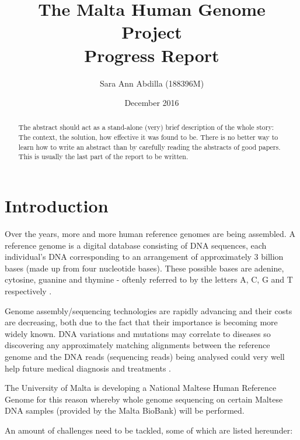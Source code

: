 \documentclass{csfyp}
\title{The Malta Human Genome Project \\
  \large Progress Report}
\author{Sara Ann Abdilla (188396M)}
\date{December 2016}
\begin{document}
\tableofcontents

\maketitle

\setcounter{page}{1}


\begin{abstract}
The abstract should act as a stand-alone (very) brief description of the whole story: The context, the solution, how effective it was found to be. There is no better way to learn how to write an abstract than by carefully reading the abstracts of good papers. This is usually the last part of the report to be written.
\end{abstract}


\section{Introduction}
\label{s:intro}

Over the years, more and more human reference genomes are being assembled.  A reference genome is a digital database consisting of DNA sequences, each individual's DNA corresponding to an arrangement of approximately 3 billion bases (made up from four nucleotide bases).  These possible bases are adenine, cytosine, guanine and thymine - oftenly referred to by the letters A, C, G and T respectively \cite{aiBk, introgenom}.  

Genome assembly/sequencing technologies are rapidly advancing and their costs are decreasing, both due to the fact that their importance is becoming more widely known.  DNA variations and mutations may correlate to diseases so discovering any approximately matching alignments between the reference genome and the DNA reads (sequencing reads) being analysed could very well help future medical diagnosis and treatments \cite{think1, think2, think3}.

The University of Malta is developing a National Maltese Human Reference Genome for this reason whereby whole genome sequencing on certain Maltese DNA samples (provided by the Malta BioBank) will be performed.    
   
An amount of challenges need to be tackled, some of which are listed hereunder:
\end{document}
